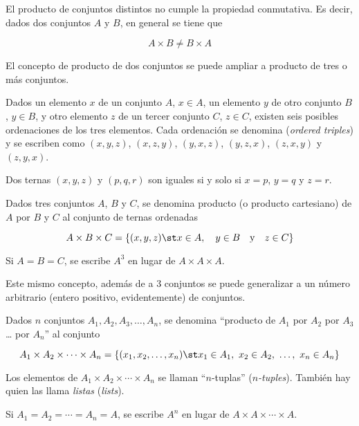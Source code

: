 El producto de conjuntos distintos no cumple la propiedad conmutativa. Es
decir, dados dos conjuntos $A$ y $B$, en general se tiene que

\[ A \times B \neq B \times A \]

El concepto de producto de dos conjuntos se puede ampliar a producto de tres
o más conjuntos.

Dados un elemento $x$ de un conjunto $A$, $x \in A$, un elemento $y$ de otro
conjunto $B$, $y \in B$, y otro elemento $z$ de un tercer conjunto $C$, $z
\in C$, existen seis posibles ordenaciones de los tres elementos. Cada
ordenación se denomina  (\emph{ordered triples}) y se
escriben como $(x, y, z)$, $(x, z, y)$, $(y, x, z)$, $(y, z, x)$, $(z, x,
y)$ y $(z, y, x)$.

Dos ternas $(x, y, z)$ y $(p, q, r)$ son iguales si y solo si $x = p$, $y =
q$ y $z = r$.

Dados tres conjuntos $A$, $B$ y $C$, se denomina producto (o producto
cartesiano) de $A$ por $B$ y $C$ al conjunto de ternas ordenadas

\[ A \times B \times C = \{(x, y, z) \st x \in A, \quad y \in B \quad
\text{y} \quad z \in C\} \]

Si $A = B = C$, se escribe $A^3$ en lugar de $A \times A \times A$.

Este mismo concepto, además de a 3 conjuntos se puede generalizar a un
número arbitrario (entero positivo, evidentemente) de conjuntos.

Dados $n$ conjuntos $A_1, A_2, A_3, \ldots, A_n$, se denomina ``producto de
$A_1$ por $A_2$ por $A_3$ \dots{} por $A_n$'' al conjunto

\[ A_1 \times A_2 \times \cdots \times A_n = \{(x_1, x_2, \ldots, x_n) \st
x_1 \in A_1, \ x_2 \in A_2, \ \ldots, \ x_n \in A_n\} \]

Los elementos de $A_1 \times A_2 \times \cdots \times A_n$ se llaman
``$n$-tuplas'' (\emph{$n$-tuples}). También hay quien las llama
\emph{listas} (\emph{lists}).\footnotemark


Si $A_1 = A_2 = \cdots = A_n = A$, se escribe $A^n$ en lugar de $A \times A
\times \cdots \times A$.

